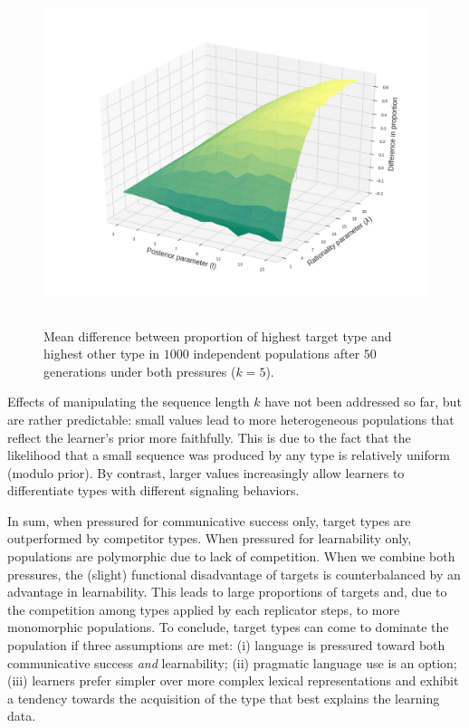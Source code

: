 \documentclass[a4paper, 11pt]{article}
\theoremstyle{Satz}
\begin{document}
\begin{figure}[t]
\centering
\includegraphics[width=1\textwidth,height=10cm,keepaspectratio]{./plots/fig4-3d-incumbents-difference} %
\caption{Mean difference between proportion of highest target type and highest other type in
  $1000$ independent populations after $50$ generations under both pressures ($k = 5$).}
\label{fig:diff}
\end{figure}

Effects of manipulating the sequence length $k$ have not been addressed so far, but are rather
predictable: small values lead to more heterogeneous populations that reflect the learner's
prior more faithfully. This is due to the fact that the likelihood that a small sequence was
produced by any type is relatively uniform (modulo prior). By contrast, larger values
increasingly allow learners to differentiate types with different signaling behaviors.

In sum, when pressured for communicative success only, target types are outperformed by
competitor types. When pressured for learnability only, populations are polymorphic due to lack
of competition. When we combine both pressures, the (slight) functional disadvantage of targets
is counterbalanced by an advantage in learnability. This leads to large proportions of targets
and, due to the competition among types applied by each replicator steps, to more monomorphic
populations. To conclude, target types can come to dominate the population if three assumptions
are met: (i) language is pressured toward both communicative success {\em and} learnability;
(ii) pragmatic language use is an option; (iii) learners prefer simpler over more complex
lexical representations and exhibit a tendency towards the acquisition of the type that best
explains the learning data.
\end{document}
